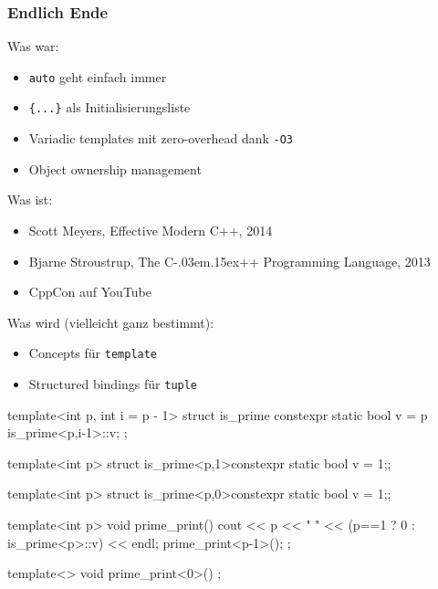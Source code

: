 \documentclass[t,ngerman,usepdftitle=false]{beamer}
\newcommand\Cpp{%
  C\kern-.03em\raise.15ex\hbox{++}%
  \spacefactor1000}
\begin{document}
\begin{frame}[fragile]
  \frametitle{Endlich Ende}
  
  Was war:
  \begin{itemize}
    \item \lstinline|auto| geht einfach immer
    \item \lstinline|{...}| als Initialisierungsliste
    \item Variadic templates mit zero-overhead dank \lstinline|-O3|
    \item Object ownership management
  \end{itemize}
  
  Was ist:
  \begin{itemize}
    \item Scott Meyers, Effective Modern C++, 2014
    \item Bjarne Stroustrup, The \Cpp{} Programming Language, 2013
    \item CppCon auf YouTube
  \end{itemize}
  
  Was wird (vielleicht ganz bestimmt):
  \begin{itemize}
    \item Concepts für \lstinline|template|
    \item Structured bindings für \lstinline|tuple|
  \end{itemize}
  
\end{frame}

\begin{frame}[fragile]
  
  \begin{cpplisting}
template<int p, int i = p - 1>
struct is_prime {
 constexpr static bool v = p %
                           is_prime<p,i-1>::v;
};
    
template<int p>
struct is_prime<p,1>{constexpr static bool v = 1;};

template<int p>
struct is_prime<p,0>{constexpr static bool v = 1;};
    
template<int p>
void prime_print() {
  cout << p << " "
       << (p==1 ? 0 : is_prime<p>::v) << endl;
  prime_print<p-1>();
};
    
template<> void prime_print<0>() {};
  \end{cpplisting}
  
\end{frame}
\end{document}
